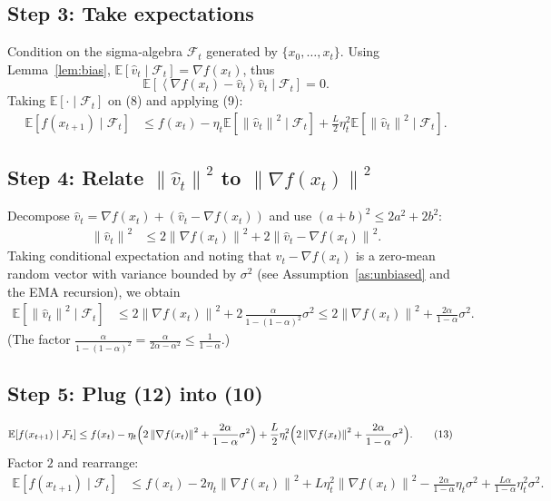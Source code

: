 \documentclass{article}
\newcommand{\E}{\mathbb{E}}
\newcommand{\norm}[1]{\left\|#1\right\|}
\newcommand{\inner}[1]{\left\langle #1 \right\rangle}
\newcommand{\grad}{\nabla}
\begin{document}
\subsection*{Step 3: Take expectations}
Condition on the sigma‑algebra $\mathcal{F}_{t}$ generated by $\{x_{0},\dots ,x_{t}\}$.  
Using Lemma~\ref{lem:bias}, $\E[\hat v_{t}\mid\mathcal{F}_{t}]=\grad f(x_{t})$, thus
\[
\E\!\left[\inner{\grad f(x_{t})-\hat v_{t}}{\hat v_{t}}\mid\mathcal{F}_{t}\right]=0.
\tag{9}
\]
Taking $\E[\cdot\mid\mathcal{F}_{t}]$ on (8) and applying (9):
\begin{align}
\E\!\left[f(x_{t+1})\mid\mathcal{F}_{t}\right]
&\le f(x_{t}) -\eta_{t}\E\!\left[\norm{\hat v_{t}}^{2}\mid\mathcal{F}_{t}\right]
   +\frac{L}{2}\eta_{t}^{2}\E\!\left[\norm{\hat v_{t}}^{2}\mid\mathcal{F}_{t}\right]. \tag{10}
\end{align}

\subsection*{Step 4: Relate $\norm{\hat v_{t}}^{2}$ to $\norm{\grad f(x_{t})}^{2}$}
Decompose $\hat v_{t}= \grad f(x_{t}) + (\hat v_{t}-\grad f(x_{t}))$ and use $(a+b)^{2}\le 2a^{2}+2b^{2}$:
\begin{align}
\norm{\hat v_{t}}^{2}
&\le 2\norm{\grad f(x_{t})}^{2}+2\norm{\hat v_{t}-\grad f(x_{t})}^{2}. \tag{11}
\end{align}
Taking conditional expectation and noting that $\hat v_{t}-\grad f(x_{t})$ is a zero‑mean random vector with variance bounded by $\sigma^{2}$ (see Assumption~\ref{as:unbiased} and the EMA recursion), we obtain
\begin{align}
\E\!\left[\norm{\hat v_{t}}^{2}\mid\mathcal{F}_{t}\right]
&\le 2\norm{\grad f(x_{t})}^{2}+2\,\frac{\alpha}{1-(1-\alpha)^{2}}\sigma^{2}
\le 2\norm{\grad f(x_{t})}^{2}+ \frac{2\alpha}{1-\alpha}\sigma^{2}. \tag{12}
\end{align}
(The factor $\frac{\alpha}{1-(1-\alpha)^{2}}=\frac{\alpha}{2\alpha-\alpha^{2}}\le \frac{1}{1-\alpha}$.)

\subsection*{Step 5: Plug (12) into (10)}
\begin{align}
\E\!\left[f(x_{t+1})\mid\mathcal{F}_{t}\right]
&\le f(x_{t})
   -\eta_{t}\Bigl(2\norm{\grad f(x_{t})}^{2}+ \frac{2\alpha}{1-\alpha}\sigma^{2}\Bigr)
   +\frac{L}{2}\eta_{t}^{2}\Bigl(2\norm{\grad f(x_{t})}^{2}+ \frac{2\alpha}{1-\alpha}\sigma^{2}\Bigr). \tag{13}
\end{align}
Factor $2$ and rearrange:
\begin{align}
\E\!\left[f(x_{t+1})\mid\mathcal{F}_{t}\right]
&\le f(x_{t})
   -2\eta_{t}\norm{\grad f(x_{t})}^{2}
   +L\eta_{t}^{2}\norm{\grad f(x_{t})}^{2}
   -\frac{2\alpha}{1-\alpha}\eta_{t}\sigma^{2}
   +\frac{L\alpha}{1-\alpha}\eta_{t}^{2}\sigma^{2}. \tag{14}
\end{align}
\end{document}
